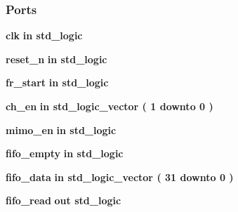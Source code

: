 \subsubsection*{Ports}
 \begin{DoxyCompactItemize}
\item 
{\bf clk}  {\bfseries {\bfseries \textcolor{keywordflow}{in}\textcolor{vhdlchar}{ }}} {\bfseries \textcolor{comment}{std\+\_\+logic}\textcolor{vhdlchar}{ }} 
\item 
{\bf reset\+\_\+n}  {\bfseries {\bfseries \textcolor{keywordflow}{in}\textcolor{vhdlchar}{ }}} {\bfseries \textcolor{comment}{std\+\_\+logic}\textcolor{vhdlchar}{ }} 
\item 
{\bf fr\+\_\+start}  {\bfseries {\bfseries \textcolor{keywordflow}{in}\textcolor{vhdlchar}{ }}} {\bfseries \textcolor{comment}{std\+\_\+logic}\textcolor{vhdlchar}{ }} 
\item 
{\bf ch\+\_\+en}  {\bfseries {\bfseries \textcolor{keywordflow}{in}\textcolor{vhdlchar}{ }}} {\bfseries \textcolor{comment}{std\+\_\+logic\+\_\+vector}\textcolor{vhdlchar}{ }\textcolor{vhdlchar}{(}\textcolor{vhdlchar}{ }\textcolor{vhdlchar}{ } \textcolor{vhdldigit}{1} \textcolor{vhdlchar}{ }\textcolor{keywordflow}{downto}\textcolor{vhdlchar}{ }\textcolor{vhdlchar}{ } \textcolor{vhdldigit}{0} \textcolor{vhdlchar}{ }\textcolor{vhdlchar}{)}\textcolor{vhdlchar}{ }} 
\item 
{\bf mimo\+\_\+en}  {\bfseries {\bfseries \textcolor{keywordflow}{in}\textcolor{vhdlchar}{ }}} {\bfseries \textcolor{comment}{std\+\_\+logic}\textcolor{vhdlchar}{ }} 
\item 
{\bf fifo\+\_\+empty}  {\bfseries {\bfseries \textcolor{keywordflow}{in}\textcolor{vhdlchar}{ }}} {\bfseries \textcolor{comment}{std\+\_\+logic}\textcolor{vhdlchar}{ }} 
\item 
{\bf fifo\+\_\+data}  {\bfseries {\bfseries \textcolor{keywordflow}{in}\textcolor{vhdlchar}{ }}} {\bfseries \textcolor{comment}{std\+\_\+logic\+\_\+vector}\textcolor{vhdlchar}{ }\textcolor{vhdlchar}{(}\textcolor{vhdlchar}{ }\textcolor{vhdlchar}{ } \textcolor{vhdldigit}{31} \textcolor{vhdlchar}{ }\textcolor{keywordflow}{downto}\textcolor{vhdlchar}{ }\textcolor{vhdlchar}{ } \textcolor{vhdldigit}{0} \textcolor{vhdlchar}{ }\textcolor{vhdlchar}{)}\textcolor{vhdlchar}{ }} 
\item 
{\bf fifo\+\_\+read}  {\bfseries {\bfseries \textcolor{keywordflow}{out}\textcolor{vhdlchar}{ }}} {\bfseries \textcolor{comment}{std\+\_\+logic}\textcolor{vhdlchar}{ }} 
\item 

\end{DoxyCompactItemize}
